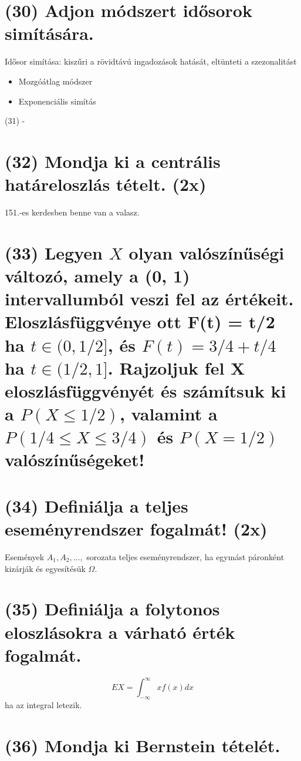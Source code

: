 \documentclass[12p]{article}
\begin{document}
\section{(30) Adjon módszert idősorok simítására.}

Idősor simítása: kiszűri a rövidtávú ingadozások hatását,
eltünteti a szezonalitást

\begin{itemize}
	\item Mozgóátlag módszer
	\item Exponenciális simítás
\end{itemize}

(31) -

\section{(32) Mondja ki a centrális határeloszlás tételt. (2x)}

151.-es kerdesben benne van a valasz.

\section{(33) Legyen $X$ olyan valószínűségi változó, amely a (0, 1) intervallumból veszi fel az értékeit. Eloszlásfüggvénye ott F(t) = t/2 ha $t \in (0, 1/2]$, és $F(t) = 3/4 + t/4$ ha $t \in (1/2, 1]$. Rajzoljuk fel X eloszlásfüggvényét és számítsuk ki a $P(X \leq 1/2)$, valamint a $P(1/4 \leq X \leq 3/4)$ és $P(X = 1/2)$ valószínűségeket!}

\section{(34) Definiálja a teljes eseményrendszer fogalmát! (2x)}

Események $A_1, A_2, ...,$ sorozata teljes eseményrendszer, ha
egymást páronként kizárják és egyesítésük $\Omega$.

\section{(35) Definiálja a folytonos eloszlásokra a várható érték fogalmát.}

$$EX = \int_{-\infty}^{\infty} x f(x) dx$$
ha az integral letezik.

\section{(36) Mondja ki Bernstein tételét.}
\end{document}
